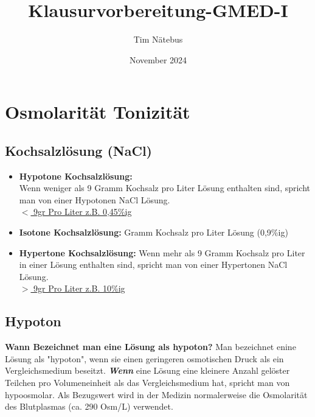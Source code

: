 \documentclass{article}
\title{Klausurvorbereitung-GMED-I}
\author{Tim Nätebus}
\date{November 2024}
\begin{document}
\maketitle

\newpage
%





\newpage
\section{Osmolarität \/ Tonizität}
\subsection{Kochsalzlösung (NaCl)}
\begin{itemize}
    \item \textbf{Hypotone Kochsalzlösung:} \\
    Wenn weniger als 9 Gramm Kochsalz pro Liter Lösung enthalten sind, spricht man von einer Hypotonen NaCl Lösung.
    \\ \underline{$<$ 9gr Pro Liter z.B. 0,45\%ig}
    \item \textbf{Isotone Kochsalzlösung:}  Gramm Kochsalz pro Liter Lösung (0,9\%ig)
    \item \textbf{Hypertone Kochsalzlösung:} \newline Wenn mehr als 9 Gramm Kochsalz pro Liter in einer Lösung enthalten sind, spricht man von einer Hypertonen NaCl Lösung.
    \\
    \underline{$>$ 9gr Pro Liter z.B. 10\%ig}
\end{itemize}

\subsection{Hypoton}
\textbf{Wann Bezeichnet man eine Lösung als hypoton?}
Man bezeichnet enine Lösung als "hypoton", wenn sie einen geringeren osmotischen Druck als ein Vergleichsmedium beseitzt. \newline 
\textbf{\textit{Wenn}} eine Lösung eine kleinere Anzahl gelöster Teilchen pro Volumeneinheit als das Vergleichsmedium hat, spricht man von hypoosmolar. \newline
Als Bezugswert wird in der Medizin normalerweise die Osmolarität des Blutplasmas (ca. 290 Osm/L) verwendet.
\end{document}
